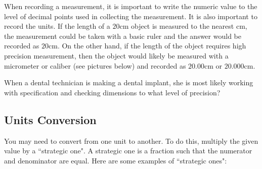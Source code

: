 \documentclass{ximera}
\begin{document}
\begin{question}\label{q:equalLength}
When recording a measurement, it is important to write the numeric value to the level of decimal points used in collecting the measurement. It is also important to record the units.  If the length of a $20$cm object is measured to the nearest cm, the measurement could be taken with a basic ruler and the answer would be recorded as $20$cm.  On the other hand, if the length of the object requires high precision measurement, then the object would likely be measured with a micrometer or caliber (see pictures below) and recorded as $20.00$cm or $20.000$cm.

\begin{center}
      \end{center}

When a dental technician is making a dental implant, she is most likely working with specification and checking dimensions to what level of precision?
\begin{multipleChoice} 
\end{multipleChoice} 
\end{question}

\subsection*{Units Conversion}
You may need to convert from one unit to another. To do this, multiply the given value by a ``strategic one". A strategic one is a fraction such that the numerator and denominator are equal.  Here are some examples of ``strategic ones":
\end{document}
